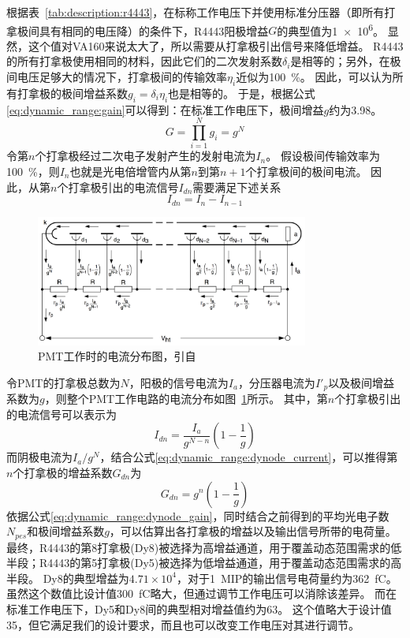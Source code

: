 根据表~\ref{tab:description:r4443}，在标称工作电压下并使用标准分压器（即所有打拿极间具有相同的电压降）的条件下，R4443阳极增益$G$的典型值为\SI{1e6}{}。
显然，这个值对VA160来说太大了，所以需要从打拿极引出信号来降低增益。
R4443的所有打拿极使用相同的材料，因此它们的二次发射系数$\delta_i$是相等的；另外，在极间电压足够大的情况下，打拿极间的传输效率$\eta_i$近似为\SI{100}{\percent}。
因此，可以认为所有打拿极的极间增益系数$g_i=\delta_i\eta_i$也是相等的。
于是，根据公式\ref{eq:dynamic_range:gain}可以得到：在标准工作电压下，极间增益$g$约为3.98。
\begin{equation}
	G = \prod_{i=1}^{N} g_i = g^N
	\label{eq:dynamic_range:gain}
\end{equation}
令第$n$个打拿极经过二次电子发射产生的发射电流为$I_n$。
假设极间传输效率为\SI{100}{\percent}，则$I_n$也就是光电倍增管内从第$n$到第$n+1$个打拿极间的极间电流。
因此，从第$n$个打拿极引出的电流信号$I_{dn}$需要满足下述关系
\begin{equation}
	I_{dn} = I_n - I_{n-1}
	\label{eq:dynamic_range:dynodes_relation}
\end{equation}
\begin{figure}[!htb]
	\centering
	\includegraphics[width=0.8\textwidth]{chap/dynamic_range/fig/pmt_current_distribution_photonics.png}
	\caption{PMT工作时的电流分布图，引自\parencite{photonis_photomultiplier}}
	\label{fig:dynamic_range:current_distribution}
\end{figure}
令PMT的打拿极总数为$N$，阳极的信号电流为$I_a$，分压器电流为$I'_p$以及极间增益系数为$g$，则整个PMT工作电路的电流分布如图~\ref{fig:dynamic_range:current_distribution}所示。
其中，第$n$个打拿极引出的电流信号可以表示为
\begin{equation}
	I_{dn} = \frac{I_a}{g^{N-n}}(1-\frac{1}{g})
	\label{eq:dynamic_range:dynode_current}
\end{equation}
而阴极电流为$I_a/g^N$，结合公式\ref{eq:dynamic_range:dynode_current}，可以推得第$n$个打拿极的增益系数$G_{dn}$为
\begin{equation}
	G_{dn} = g^n(1-\frac{1}{g})
	\label{eq:dynamic_range:dynode_gain}
\end{equation}
依据公式\ref{eq:dynamic_range:dynode_gain}，同时结合之前得到的平均光电子数$N_{pes}$和极间增益系数$g$，可以估算出各打拿极的增益以及输出信号所带的电荷量。
最终，R4443的第8打拿极(Dy8)被选择为高增益通道，用于覆盖动态范围需求的低半段；R4443的第5打拿极(Dy5)被选择为低增益通道，用于覆盖动态范围需求的高半段。
Dy8的典型增益为$4.71\times10^4$，对于\SI{1}{MIP}的输出信号电荷量约为\SI{362}{\femto\coulomb}。
虽然这个数值比设计值\SI{300}{\femto\coulomb}略大，但通过调节工作电压可以消除该差异。
而在标准工作电压下，Dy5和Dy8间的典型相对增益值约为63。
这个值略大于设计值35，但它满足我们的设计要求，而且也可以改变工作电压对其进行调节。

